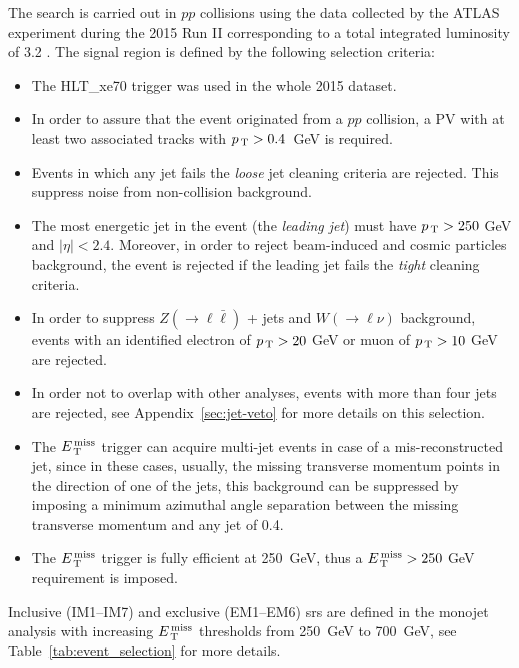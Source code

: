 The search is carried out in $pp$ collisions using the data collected by the
ATLAS experiment during the 2015 Run II corresponding to a total integrated
luminosity of 3.2 \ifb. The signal region is defined by the following selection
criteria:
\begin{itemize}
\item The HLT\_xe70 trigger was used in the whole 2015 dataset.
\item In order to assure that the event originated from a $pp$ collision, a PV
  with at least two associated tracks with $p_\mathrm{\, T} > 0.4$~GeV is required.
\item Events in which any jet fails the \emph{loose} jet cleaning criteria are
  rejected. This suppress noise from non-collision background.
\item The most energetic jet in the event (the \emph{leading jet}) must have
  $p_\mathrm{\, T} > 250~$GeV and $|\eta| < 2.4$. Moreover, in order to reject beam-induced
  and cosmic particles background, the event is rejected if the leading jet
  fails the \emph{tight} cleaning criteria.
\item In order to suppress $Z (\rightarrow \ell \bar{\ell})$ + jets and
  $W (\rightarrow \ell \nu)$ background, events with an identified electron of
  $p_\mathrm{\, T} > 20~$GeV or muon of $p_\mathrm{\, T} > 10~$GeV are rejected.
\item In order not to overlap with other analyses, events with more than four
  jets are rejected, see Appendix~\ref{sec:jet-veto} for more details on this
  selection.
\item The $E_\mathrm{\, T}^\mathrm{\, miss}$ trigger can acquire multi-jet events in case of a
  mis-reconstructed jet, since in these cases, usually, the missing transverse
  momentum points in the direction of one of the jets, this background can be
  suppressed by imposing a minimum azimuthal angle separation between the
  missing transverse momentum and any jet of 0.4.
\item The $E_\mathrm{\, T}^\mathrm{\, miss}$ trigger is fully efficient at 250~GeV, thus a $E_\mathrm{\, T}^\mathrm{\, miss} > 250~$GeV
  requirement is imposed.
\end{itemize}
Inclusive (IM1--IM7) and exclusive (EM1--EM6) \glspl{sr} are defined in the
monojet analysis with increasing $E_\mathrm{\, T}^\mathrm{\, miss}$ thresholds from 250~GeV to 700~GeV, see
Table~\ref{tab:event_selection} for more details.

